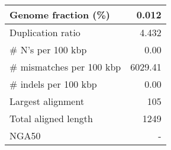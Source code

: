 \documentclass[12pt,a4paper]{article}
\begin{document}
\begin{table}[ht]
\begin{center}
\begin{tabular}{|l*{1}{|r}|}
Genome fraction (\%) & 0.012 \\ \hline
Duplication ratio & 4.432 \\ \hline
\# N's per 100 kbp & 0.00 \\ \hline
\# mismatches per 100 kbp & 6029.41 \\ \hline
\# indels per 100 kbp & 0.00 \\ \hline
Largest alignment & 105 \\ \hline
Total aligned length & 1249 \\ \hline
NGA50 & - \\ \hline
\end{tabular}
\end{center}
\end{table}
\end{document}
